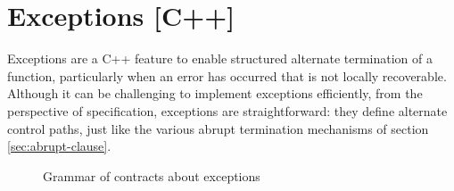 \section{Exceptions [C++]}
\label{sec:exceptions}

Exceptions are a C++ feature to enable structured alternate termination of a function, particularly when an error has occurred that is not locally recoverable. Although it can be challenging to implement exceptions efficiently, from the perspective of specification, exceptions are straightforward: they define alternate control paths, just like the various abrupt termination mechanisms of section \ref{sec:abrupt-clause}.

\begin{figure}[htp]
	\begin{cadre}
		
	\end{cadre}
	\caption{Grammar of contracts about exceptions}
	\label{fig:gram:throws-clause}
\end{figure}


